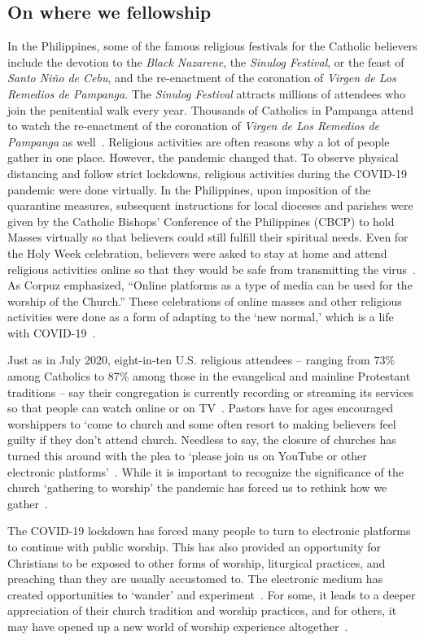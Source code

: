 \subsection{On where we fellowship}
In the Philippines, some of the famous religious festivals for the Catholic believers include the devotion to the \textit{Black Nazarene}, the \textit{Sinulog Festival}, or the feast of \textit{Santo Niño de Cebu}, and the re-enactment of the coronation of \textit{Virgen de Los Remedios de Pampanga}. The \textit{Sinulog Festival} attracts millions of attendees who join the penitential walk every year. Thousands of Catholics in Pampanga attend to watch the re-enactment of the coronation of \textit{Virgen de Los Remedios de Pampanga} as well~\cite{gozum}. Religious activities are often reasons why a lot of people gather in one place. However, the pandemic changed that. To observe physical distancing and follow strict lockdowns, religious activities during the COVID-19 pandemic were done virtually. In the Philippines, upon imposition of the quarantine measures, subsequent instructions for local dioceses and parishes were given by the Catholic Bishops’ Conference of the Philippines (CBCP) to hold Masses virtually so that believers could still fulfill their spiritual needs. Even for the Holy Week celebration, believers were asked to stay at home and attend religious activities online so that they would be safe from transmitting the virus~\cite{gozum}. As Corpuz emphasized, “Online platforms as a type of media can be used for the worship of the Church.” These celebrations of online masses and other religious activities were done as a form of adapting to the ‘new normal,’ which is a life with COVID-19~\cite{gozum}. 

Just as in July 2020, eight-in-ten U.S. religious attendees – ranging from 73\% among Catholics to 87\% among those in the evangelical and mainline Protestant traditions – say their congregation is currently recording or streaming its services so that people can watch online or on TV~\cite{smith}. Pastors have for ages encouraged worshippers to ‘come to church and some often resort to making believers feel guilty if they don’t attend church. Needless to say, the closure of churches has turned this around with the plea to ‘please join us on YouTube or other electronic platforms’~\cite{jerry:pillay}. While it is important to recognize the significance of the church ‘gathering to worship’ the pandemic has forced us
to rethink how we gather~\cite{jerry:pillay}.

The COVID-19 lockdown has forced many people to turn to electronic platforms to continue with public worship. This has also provided an opportunity for Christians to be exposed to other forms of worship, liturgical practices, and preaching than they are usually accustomed to. The electronic medium has created opportunities to ‘wander’ and experiment~\cite{jerry:pillay}. For some, it leads to a deeper appreciation of their church tradition and worship practices, and for others, it may have opened up a new world of worship experience altogether~\cite{jerry:pillay}.

